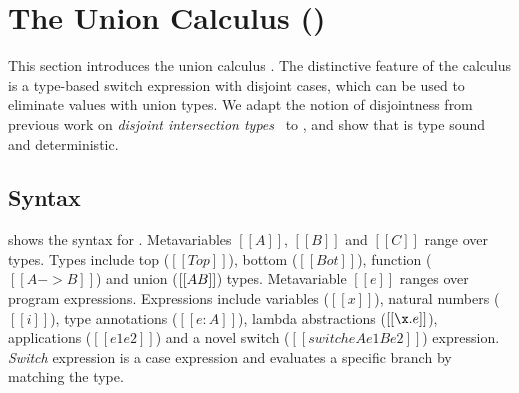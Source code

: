 \section{The Union Calculus (\name)}
\label{sec:union}

 
This section introduces the union calculus \name. The distinctive feature
of the \name calculus is a type-based switch expression with disjoint
cases, which can be used to eliminate values with union types.
We adapt the notion of disjointness from previous work on
\emph{disjoint intersection types}~\cite{} to \name, and show that \name is type
sound and deterministic.


\subsection{Syntax}\label{sec:union:syntax}
 shows the syntax for \cal. Metavariables
$[[A]]$, $[[B]]$ and $[[C]]$ range over types.  Types include top ($[[Top]]$),
bottom ($[[Bot]]$), function ($[[A -> B]]$) and union ($[[A \/ B]]$)
types. Metavariable $[[e]]$ ranges over program
expressions. Expressions include variables ($[[x]]$), natural numbers
($[[i]]$), type annotations ($[[e:A]]$), lambda abstractions
($[[\x.e]]$), applications ($[[e1 e2]]$) and a novel switch ($[[switch
    e A e1 B e2]]$) expression. \emph{Switch} expression is a case
expression and evaluates a specific branch by matching the
type.

